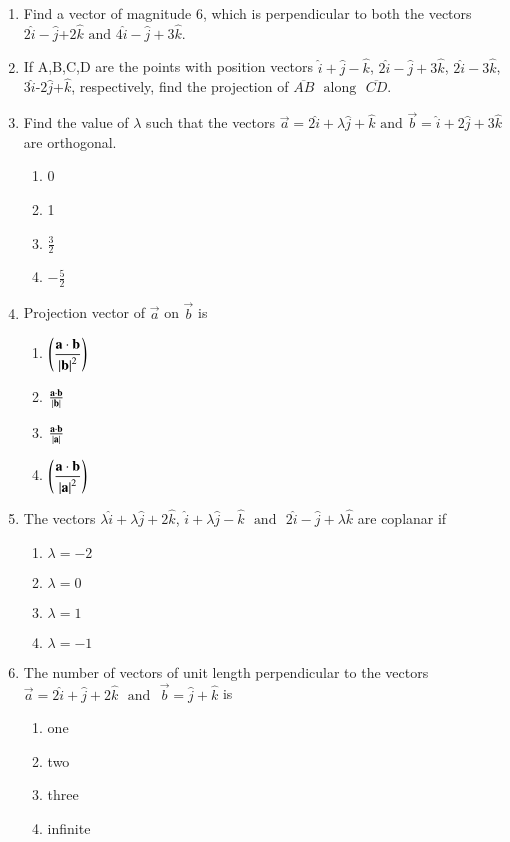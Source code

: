 \begin{enumerate}[label=\thesection.\arabic*,ref=\thesection.\theenumi]
\item Find a vector of magnitude 6, which is perpendicular to both the vectors $2\hat{i}-\hat{j}$+$2\hat{k}\text{ and }4\hat{i}-\hat{j}+3\hat{k}$.
\item If A,B,C,D  are the points with position vectors $\hat{i}+\hat{j}-\hat{k}$, $2\hat{i}-\hat{j}+3\hat{k}$, $2\hat{i}-3\hat{k}$, $3\hat{i}$-$2\hat{j}$+$\hat{k}$, respectively, find the projection of $\overline{AB}$ $\text{ along }$ $\overline{CD}$.
\item Find the value of $\lambda$ such that the vectors $\vec{a}=2\hat{i}+\lambda\hat{j}+\hat{k}$ $\text{and}$ $\vec{b}=\hat{i}+2\hat{j}+3\hat{k}$ are orthogonal.
	\begin{enumerate}
\item 0
\item 1 
\item $\frac{3}{2}$
\item $-\frac{5}{2}$
	\end{enumerate}
\item Projection vector of $\vec{a}$ on $\vec{b}$ is
	\begin{enumerate}
\item $\left(\dfrac{\mathbf{a}\cdot\mathbf{b}}{\left\vert\mathbf{b}\right\vert^2}\right)$
\item $\frac{\mathbf{a}\cdot\mathbf{b}}{\left\vert\mathbf{b}\right\vert}$
\item $\frac{\mathbf{a}\cdot\mathbf{b}}{\left\vert\mathbf{a}\right\vert}$
\item $\left(\dfrac{\mathbf{a}\cdot\mathbf{b}}{\left\vert\mathbf{a}\right\vert^2}\right)$
\end{enumerate}
\item The vectors $\lambda\hat{i}+\lambda\hat{j}+2\hat{k}$, $\hat{i}+\lambda\hat{j}-\hat{k}$ $\text{ and }$ $2\hat{i}-\hat{j}+\lambda\hat{k}$ are coplanar if
	\begin{enumerate}
\item	$\lambda=-2$
\item $\lambda=0$
\item $\lambda=1$
\item	$\lambda=-1$
\end{enumerate}
\item The number of vectors of unit length perpendicular to the vectors $\vec{a}=2\hat{i}+\hat{j}+2\hat{k}$ $\text{ and }$ $\vec{b}=\hat{j}+\hat{k}$ is
	\begin{enumerate}
\item one
\item  two
\item three
\item infinite

\end{enumerate}
\end{enumerate}

